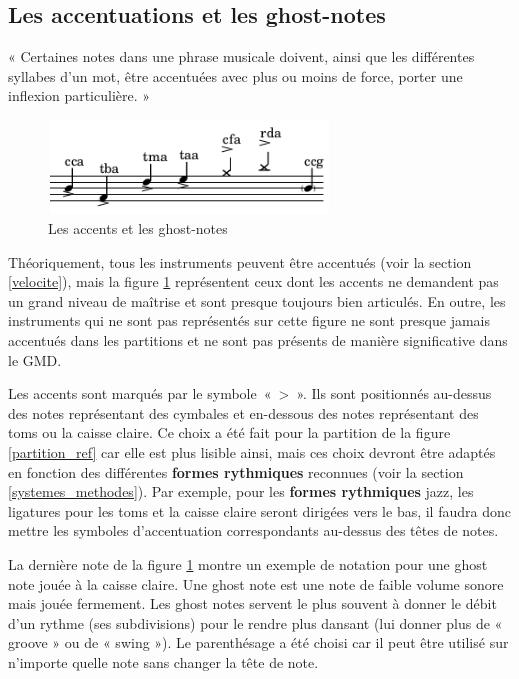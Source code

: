 \subsection*{Les accentuations et les ghost-notes}
« Certaines notes dans une phrase musicale doivent, ainsi que les différentes
syllabes d’un mot, être accentuées avec plus ou moins de force, porter une
inflexion particulière. » \cite{danhauser}
\begin{figure}[h]
\centering
\includegraphics[height=25mm, width=75mm]{
z_images/3_methodes/0_notation_de_la_batterie/8_accents_et_ghost-notes_0.png}
\caption{Les accents et les ghost-notes}
\label{accents_et_gn}
\end{figure}

Théoriquement, tous les instruments peuvent être accentués (voir la section
\ref{velocite}), mais la figure \ref{accents_et_gn} représentent ceux dont les
accents ne demandent pas un grand niveau de maîtrise et sont presque toujours
bien articulés. En outre, les instruments qui ne sont pas représentés sur cette
figure ne sont presque jamais accentués dans les partitions et ne sont pas
présents de manière significative dans le GMD.

Les accents sont marqués par le symbole~«~>~». Ils sont positionnés au-dessus
des notes représentant des cymbales et en-dessous des notes représentant des
toms ou la caisse claire. Ce choix a été fait pour la partition de la figure
\ref{partition_ref} car elle est plus lisible ainsi, mais ces choix devront
être adaptés en fonction des différentes \textbf{formes rythmiques} reconnues
(voir la section \ref{systemes_methodes}). Par exemple, pour les
\textbf{formes rythmiques} jazz, les ligatures pour les toms et la caisse
claire seront dirigées vers le bas, il faudra donc mettre les symboles
d’accentuation correspondants au-dessus des têtes de notes.

La dernière note de la figure \ref{accents_et_gn} montre un exemple de notation
pour une ghost note jouée à la caisse claire. Une ghost note
\cite{lexique_drum} est une note de faible volume sonore mais jouée fermement.
Les ghost notes servent le plus souvent à donner le débit d’un rythme (ses
subdivisions) pour le rendre plus dansant (lui donner plus de « groove » ou de
« swing »). Le parenthésage a été choisi car il peut être utilisé sur n’importe
quelle note sans changer la tête de note.

